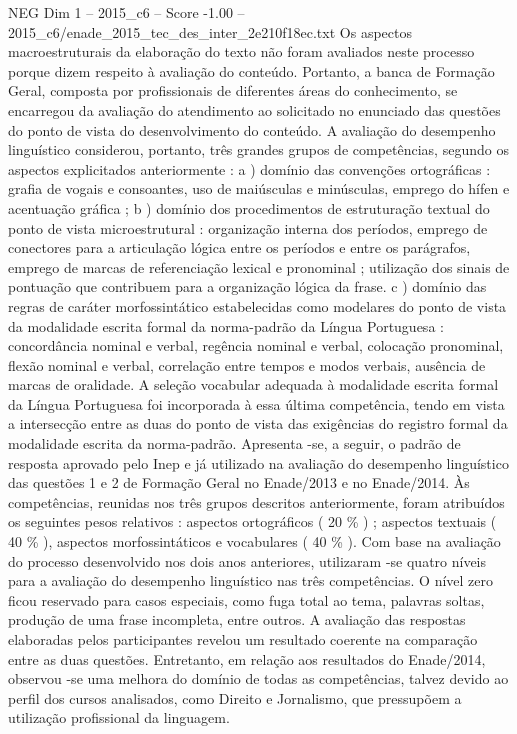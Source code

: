 \begin{textsample}{NEG Dim 1 – 2015\_c6 – Score -1.00 – 2015\_c6/enade\_2015\_tec\_des\_inter\_2e210f18ec.txt}
Os aspectos macroestruturais da elaboração do texto não foram avaliados neste processo porque dizem respeito à avaliação do conteúdo.
Portanto, a banca de Formação Geral, composta por profissionais de diferentes áreas do conhecimento, se encarregou da avaliação do atendimento ao solicitado no enunciado das questões do ponto de vista do desenvolvimento do conteúdo.
A avaliação do desempenho linguístico considerou, portanto, três grandes grupos de competências, segundo os aspectos explicitados anteriormente : a ) domínio das convenções ortográficas : grafia de vogais e consoantes, uso de maiúsculas e minúsculas, emprego do hífen e acentuação gráfica ; b ) domínio dos procedimentos de estruturação textual do ponto de vista microestrutural : organização interna dos períodos, emprego de conectores para a articulação lógica entre os períodos e entre os parágrafos, emprego de marcas de referenciação lexical e pronominal ; utilização dos sinais de pontuação que contribuem para a organização lógica da frase. c ) domínio das regras de caráter morfossintático estabelecidas como modelares do ponto de vista da modalidade escrita formal da norma-padrão da Língua Portuguesa : concordância nominal e verbal, regência nominal e verbal, colocação pronominal, flexão nominal e verbal, correlação entre tempos e modos verbais, ausência de marcas de oralidade.
A seleção vocabular adequada à modalidade escrita formal da Língua Portuguesa foi incorporada à essa última competência, tendo em vista a intersecção entre as duas do ponto de vista das exigências do registro formal da modalidade escrita da norma-padrão.
Apresenta -se, a seguir, o padrão de resposta aprovado pelo Inep e já utilizado na avaliação do desempenho linguístico das questões 1 e 2 de Formação Geral no Enade/2013 e no Enade/2014.
Às competências, reunidas nos três grupos descritos anteriormente, foram atribuídos os seguintes pesos relativos : aspectos ortográficos ( 20 \% ) ; aspectos textuais ( 40 \% ), aspectos morfossintáticos e vocabulares ( 40 \% ).
Com base na avaliação do processo desenvolvido nos dois anos anteriores, utilizaram -se quatro níveis para a avaliação do desempenho linguístico nas três competências.
O nível zero ficou reservado para casos especiais, como fuga total ao tema, palavras soltas, produção de uma frase incompleta, entre outros.
A avaliação das respostas elaboradas pelos participantes revelou um resultado coerente na comparação entre as duas questões.
Entretanto, em relação aos resultados do Enade/2014, observou -se uma melhora do domínio de todas as competências, talvez devido ao perfil dos cursos analisados, como Direito e Jornalismo, que pressupõem a utilização profissional da linguagem.

\end{textsample}
